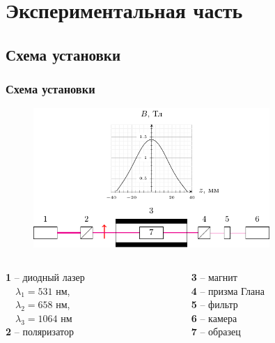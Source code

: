 \documentclass[10pt,pdf,hyperref={unicode}, dvipsnames, handout]{beamer}
\begin{document}
\section{Экспериментальная часть}
\begin{frame}
	\subsection{Схема установки}
	\frametitle{Схема установки}
	\begin{figure}[tb]
		\centering
		\includegraphics[width=0.8\textwidth]{img/chem}
	\end{figure}
	\begin{columns}
		\hspace{2.5cm}
		\begin{column}{0.3\textwidth}
			\textbf{1} -- диодный лазер\\ 
			$\quad\lambda_1=531$ нм,\\
			$\quad\lambda_2=658$ нм,\\
			$\quad\lambda_3=1064$ нм\\
			\textbf{2} -- поляризатор
		\end{column}
		\hspace{1.6cm}
		\begin{column}{0.7\textwidth}
			\textbf{3} -- магнит\\
			\textbf{4} -- призма Глана\\
			\textbf{5} -- фильтр\\
			\textbf{6} -- камера\\
			\textbf{7} -- образец
		\end{column}
	\end{columns}
\end{frame}
\end{document}
